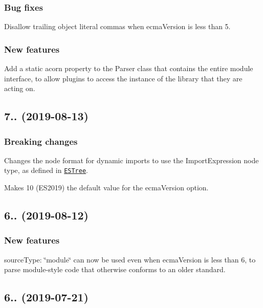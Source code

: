 \subsubsection*{Bug fixes}

Disallow trailing object literal commas when ecma\+Version is less than 5.

\subsubsection*{New features}

Add a static {\ttfamily acorn} property to the {\ttfamily Parser} class that contains the entire module interface, to allow plugins to access the instance of the library that they are acting on.

\subsection*{7.. (2019-\/08-\/13)}

\subsubsection*{Breaking changes}

Changes the node format for dynamic imports to use the {\ttfamily Import\+Expression} node type, as defined in \href{https://github.com/estree/estree/blob/master/es2020.md#importexpression}{\tt E\+S\+Tree}.

Makes 10 (E\+S2019) the default value for the {\ttfamily ecma\+Version} option.

\subsection*{6.. (2019-\/08-\/12)}

\subsubsection*{New features}

{\ttfamily source\+Type\+: \char`\"{}module\char`\"{}} can now be used even when {\ttfamily ecma\+Version} is less than 6, to parse module-\/style code that otherwise conforms to an older standard.

\subsection*{6.. (2019-\/07-\/21)}

